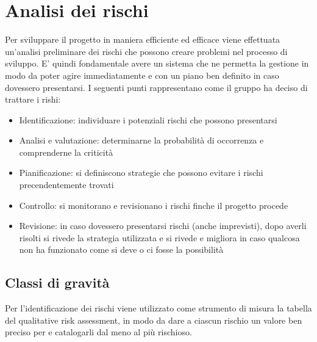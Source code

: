 \newpage
\section{Analisi dei rischi} \label{AnalisiDeiRischi}
	
	Per sviluppare il progetto in maniera efficiente ed efficace viene effettuata un'analisi preliminare dei rischi che possono creare problemi nel processo di sviluppo.
	E' quindi fondamentale avere un sistema che ne permetta la gestione in modo da poter agire immediatamente e con un piano ben definito in caso dovessero presentarsi.
	I seguenti punti rappresentano come il gruppo ha deciso di trattare i rishi:
	
	\begin{itemize}
		\item Identificazione: individuare i potenziali rischi che possono presentarsi
		\item Analisi e valutazione: determinarne la probabilità di occorrenza e comprenderne la criticità
		\item Pianificazione: si definiscono strategie che possono evitare i rischi precendentemente trovati
		\item Controllo: si monitorano e revisionano i rischi finche il progetto procede 
		\item Revisione: in caso dovessero presentarsi rischi (anche imprevisti), dopo averli risolti si rivede la strategia utilizzata e si rivede e migliora in caso qualcosa non ha funzionato come si deve o ci fosse la possibilità
	\end{itemize}
	
	\subsection{Classi di gravità}
	
	Per l'identificazione dei rischi viene utilizzato come strumento di misura la tabella del qualitative risk assessment, in modo da dare a ciascun rischio un valore ben preciso per e catalogarli dal meno al più rischioso.
	
